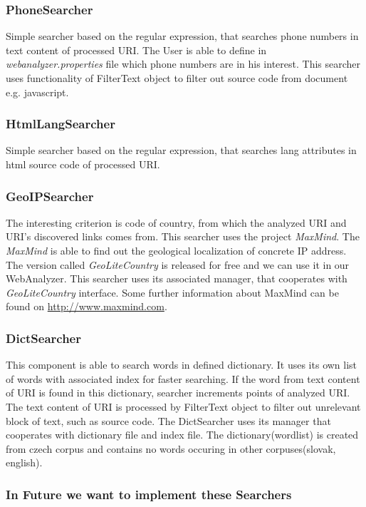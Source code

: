 \documentclass[11pt,a4paper]{article}
\begin{document}
\subsubsection*{PhoneSearcher}
Simple searcher based on the regular expression, that searches phone numbers in text content of processed URI. The User is able to define in \emph{web\-a\-na\-lyzer.properties} file which phone numbers are in his interest. This searcher uses functionality of FilterText object to filter out source code from document  e.g. javascript.

\subsubsection*{HtmlLangSearcher}
Simple searcher based on the regular expression, that searches lang attributes in html source code of processed URI.

\subsubsection*{GeoIPSearcher}
The interesting criterion is code of country, from which the analyzed URI and URI's discovered links comes from. This searcher uses the project \emph{MaxMind}. The \emph{MaxMind} is able to find out the geological localization of concrete IP address. The version called \emph{GeoLiteCountry} is released for free and we can use it in our WebAnalyzer. This searcher uses its associated manager, that cooperates with \emph{GeoLiteCountry} interface. Some further information about MaxMind can be found on \url{http://www.maxmind.com}.

\subsubsection*{DictSearcher}
This component is able to search words in defined dictionary. It uses its own list of words with associated index for faster searching. If the word from text content of URI is found in this dictionary, searcher increments points of analyzed URI. The text content of URI is processed by FilterText object to filter out unrelevant block of text, such as source code. The DictSearcher uses its manager that cooperates with dictionary file and index file. The dictionary(wordlist) is created from czech corpus and contains no words occuring in other corpuses(slovak, english).

\subsubsection*{In Future we want to implement these Searchers}
\end{document}
